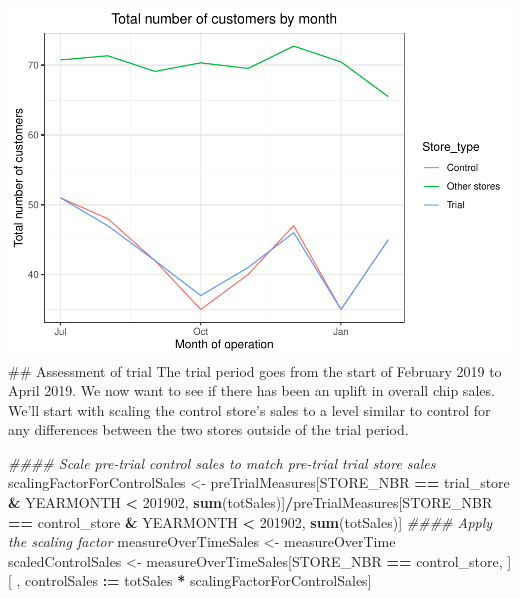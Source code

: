 \documentclass[
]{article}
\newenvironment{Shaded}{\begin{snugshade}}{\end{snugshade}}
\newcommand{\CommentTok}[1]{\textcolor[rgb]{0.56,0.35,0.01}{\textit{#1}}}
\newcommand{\DecValTok}[1]{\textcolor[rgb]{0.00,0.00,0.81}{#1}}
\newcommand{\ErrorTok}[1]{\textcolor[rgb]{0.64,0.00,0.00}{\textbf{#1}}}
\newcommand{\KeywordTok}[1]{\textcolor[rgb]{0.13,0.29,0.53}{\textbf{#1}}}
\newcommand{\NormalTok}[1]{#1}
\newcommand{\OperatorTok}[1]{\textcolor[rgb]{0.81,0.36,0.00}{\textbf{#1}}}
\newcommand{\StringTok}[1]{\textcolor[rgb]{0.31,0.60,0.02}{#1}}
\begin{document}
\includegraphics{Task2_files/figure-latex/unnamed-chunk-8-1.pdf} \#\#
Assessment of trial The trial period goes from the start of February
2019 to April 2019. We now want to see if there has been an uplift in
overall chip sales. We'll start with scaling the control store's sales
to a level similar to control for any differences between the two stores
outside of the trial period.

\begin{Shaded}
\begin{Highlighting}[]
\CommentTok{#### Scale pre-trial control sales to match pre-trial trial store sales}
\NormalTok{scalingFactorForControlSales <-}\StringTok{ }\NormalTok{preTrialMeasures[STORE_NBR }\OperatorTok{==}\StringTok{ }\NormalTok{trial_store }\OperatorTok{&}
\NormalTok{YEARMONTH }\OperatorTok{<}\StringTok{ }\DecValTok{201902}\NormalTok{, }\KeywordTok{sum}\NormalTok{(totSales)]}\OperatorTok{/}\NormalTok{preTrialMeasures[STORE_NBR }\OperatorTok{==}\StringTok{ }\NormalTok{control_store }\OperatorTok{&}
\NormalTok{YEARMONTH }\OperatorTok{<}\StringTok{ }\DecValTok{201902}\NormalTok{, }\KeywordTok{sum}\NormalTok{(totSales)]}
\CommentTok{#### Apply the scaling factor}
\NormalTok{measureOverTimeSales <-}\StringTok{ }\NormalTok{measureOverTime}
\NormalTok{scaledControlSales <-}\StringTok{ }\NormalTok{measureOverTimeSales[STORE_NBR }\OperatorTok{==}\StringTok{ }\NormalTok{control_store, ][ ,}
\NormalTok{controlSales }\OperatorTok{:}\ErrorTok{=}\StringTok{ }\NormalTok{totSales }\OperatorTok{*}\StringTok{ }\NormalTok{scalingFactorForControlSales]}
\end{Highlighting}
\end{Shaded}
\end{document}
